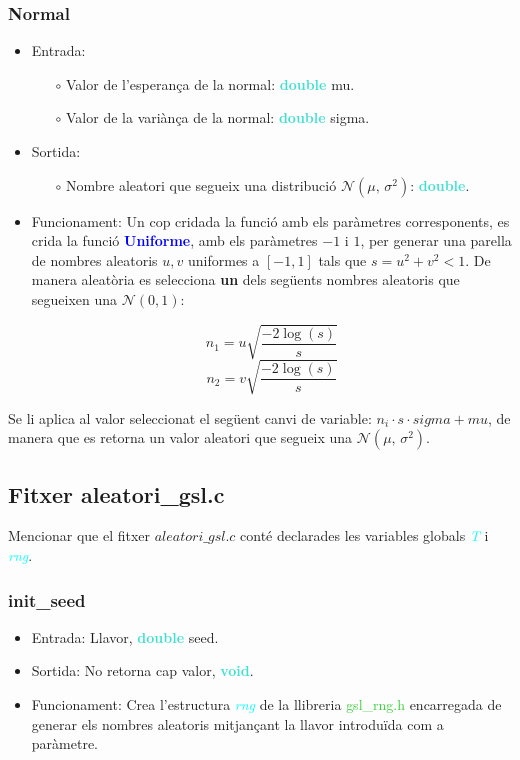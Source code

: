 \documentclass[a4paper, 11pt]{article}
\begin{document}
\subsubsection{Normal} \label{normalnormal}
\begin{itemize}
    \item Entrada:
    \begin{itemize}
        \item[$\circ$] Valor de l'esperança de la normal: \textbf{\textcolor{Turquoise}{double}} mu.
        \item[$\circ$] Valor de la variànça de la normal: \textbf{\textcolor{Turquoise}{double}} sigma.
    \end{itemize}
    \item Sortida:
        \begin{itemize}
            \item[$\circ$] Nombre aleatori que segueix una distribució $\mathcal{N}(\mu,\,\sigma^{2})$:  \textbf{\textcolor{Turquoise}{double}}.
        \end{itemize}
    \item Funcionament:
    Un cop cridada la funció amb els paràmetres corresponents, es crida la funció \textbf{\textcolor{blue}{Uniforme}}, amb els paràmetres $-1$ i $1$, per generar una parella de nombres aleatoris $u, v$ uniformes a $[-1,1]$ tals que $s = u^2 + v^2 < 1$. De manera aleatòria es selecciona \textbf{un} dels següents nombres aleatoris que segueixen una $\mathcal{N}(0,1)$:
    
    \begin{equation*}
        n_{1} = u\sqrt{\frac{-2\log(s)}{s}}
    \end{equation*}
    \begin{equation*}
        n_{2} = v\sqrt{\frac{-2\log(s)}{s}}
    \end{equation*}
    
\end{itemize}
Se li aplica al valor seleccionat el següent canvi de variable: $n_{i}\cdot s \cdot sigma+mu$, de manera que es retorna un valor aleatori que segueix una $\mathcal{N}(\mu,\,\sigma^{2})$.
\newpage
\subsection{Fitxer aleatori\_gsl.c} \label{aleatorigsl}
Mencionar que el fitxer $aleatori\_gsl.c$ conté declarades les variables globals \textcolor{cyan}{\textit{T}} i  \textcolor{cyan}{\textit{rng}}.
\subsubsection{init\_seed}
\begin{itemize}
    \item Entrada: Llavor, \textbf{\textcolor{Turquoise}{double}} seed.
    \item Sortida: No retorna cap valor, \textbf{\textcolor{Turquoise}{void}}.
    \item Funcionament:
    Crea l'estructura \textcolor{cyan}{\textit{rng}} de la llibreria  \textcolor{LimeGreen}{gsl\_rng.h} encarregada de generar els nombres aleatoris mitjançant la llavor introduïda com a paràmetre.
\end{itemize}
\end{document}
